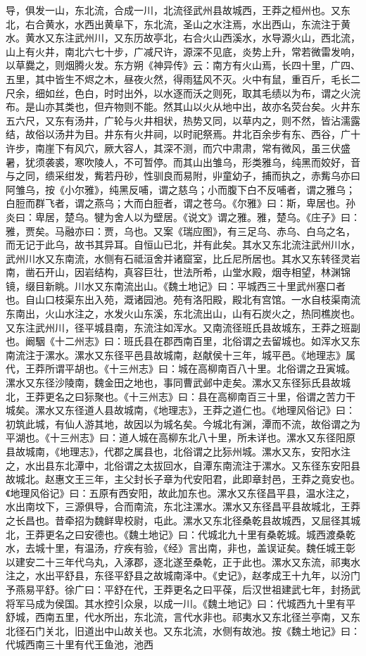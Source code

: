 \documentclass[12pt,UTF8]{ctexbook}
\begin{document}
导，俱发一山，东北流，合成一川，北流径武州县故城西，王莽之桓州也。又东北，右合黄水，水西出黄阜下，东北流，圣山之水注焉，水出西山，东流注于黄水。黄水又东注武州川，又东历故亭北，右合火山西溪水，水导源火山，西北流，山上有火井，南北六七十步，广减尺许，源深不见底，炎势上升，常若微雷发响，以草爨之，则烟腾火发。东方朔《神异传》云：南方有火山焉，长四十里，广四、五里，其中皆生不烬之木，昼夜火然，得雨猛风不灭。火中有鼠，重百斤，毛长二尺余，细如丝，色白，时时出外，以水逐而沃之则死，取其毛绩以为布，谓之火浣布。是山亦其类也，但卉物则不能。然其山以火从地中出，故亦名荧台矣。火井东五六尺，又东有汤井，广轮与火井相状，热势又同，以草内之，则不然，皆沾濡露结，故俗以汤井为目。井东有火井祠，以时祀祭焉。井北百余步有东、西谷，广十许步，南崖下有风穴，厥大容人，其深不测，而穴中肃肃，常有微风，虽三伏盛暑，犹须袭裘，寒吹陵人，不可暂停。而其山出雏乌，形类雅乌，纯黑而姣好，音与之同，缋采绀发，觜若丹砂，性驯良而易附，丱童幼子，捕而执之，赤觜乌亦曰阿雏乌，按《小尔雅》，纯黑反哺，谓之慈乌；小而腹下白不反哺者，谓之雅乌；白脰而群飞者，谓之燕乌；大而白脰者，谓之苍乌。《尔雅》曰：斯，卑居也。孙炎曰：卑居，楚乌。犍为舍人以为壁居。《说文》谓之雅。雅，楚乌。《庄子》曰：雅，贾矣。马融亦曰：贾，乌也。又案《瑞应图》，有三足乌、赤乌、白乌之名，而无记于此乌，故书其异耳。自恒山已北，并有此矣。其水又东北流注武州川水，武州川水又东南流，水侧有石祗洹舍并诸窟室，比丘尼所居也。其水又东转径灵岩南，凿石开山，因岩结构，真容巨壮，世法所希，山堂水殿，烟寺相望，林渊锦镜，缀目新眺。川水又东南流出山。《魏土地记》曰：平城西三十里武州塞口者也。自山口枝渠东出入苑，溉诸园池。苑有洛阳殿，殿北有宫馆。一水自枝渠南流东南出，火山水注之，水发火山东溪，东北流出山，山有石炭火之，热同樵炭也。又东注武州川，径平城县南，东流注如浑水。又南流径班氏县故城东，王莽之班副也。阚駰《十二州志》曰：班氏县在郡西南百里，北俗谓之去留城也。如浑水又东南流注于漯水。漯水又东径平邑县故城南，赵献侯十三年，城平邑。《地理志》属代，王莽所谓平胡也。《十三州志》曰：城在高柳南百八十里。北俗谓之丑寅城。漯水又东径沙陵南，魏金田之地也，事同曹武邺中走矣。漯水又东径狋氏县故城北，王莽更名之曰狋聚也。《十三州志》曰：县在高柳南百三十里，俗谓之苦力干城矣。漯水又东径道人县故城南，《地理志》，王莽之道仁也。《地理风俗记》曰：初筑此城，有仙人游其地，故因以为城名矣。今城北有渊，潭而不流，故俗谓之为平湖也。《十三州志》曰：道人城在高柳东北八十里，所未详也。漯水又东径阳原县故城南，《地理志》，代郡之属县也，北俗谓之比狋州城。漯水又东，安阳水注之，水出县东北潭中，北俗谓之太拔回水，自潭东南流注于漯水。又东径东安阳县故城北。赵惠文王三年，主父封长子章为代安阳君，此即章封邑，王莽之竟安也。《地理风俗记》曰：五原有西安阳，故此加东也。漯水又东径昌平县，温水注之，水出南坟下，三源俱导，合而南流，东北注漯水。漯水又东径昌平县故城北，王莽之长昌也。昔牵招为魏鲜卑校尉，屯此。漯水又东北径桑乾县故城西，又屈径其城北，王莽更名之曰安德也。《魏土地记》曰：代城北九十里有桑乾城。城西渡桑乾水，去城十里，有温汤，疗疾有验，《经》言出南，非也，盖误证矣。魏任城王彰以建安二十三年代乌丸，入涿郡，逐北遂至桑乾，正于此也。漯水又东流，祁夷水注之，水出平舒县，东径平舒县之故城南泽中。《史记》，赵孝成王十九年，以汾门予燕易平舒。徐广曰：平舒在代，王莽更名之曰平葆，后汉世祖建武七年，封扬武将军马成为侯国。其水控引众泉，以成一川。《魏土地记》曰：代城西九十里有平舒城，西南五里，代水所出，东北流，言代水非也。祁夷水又东北径兰亭南，又东北径石门关北，旧道出中山故关也。又东北流，水侧有故池。按《魏土地记》曰：代城西南三十里有代王鱼池，池西
\end{document}
